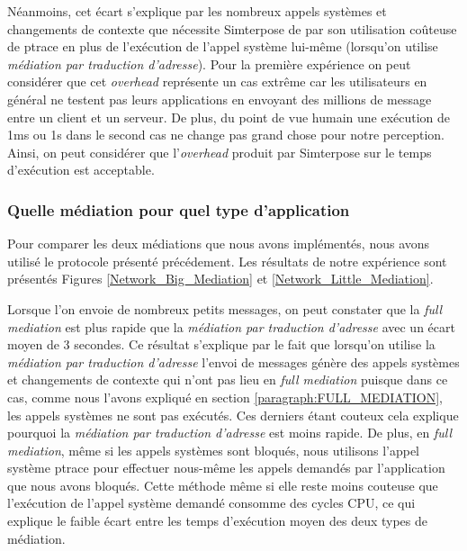 Néanmoins, cet écart s'explique par les nombreux appels systèmes et changements de contexte que nécessite Simterpose de par son utilisation coûteuse de ptrace en plus de l'exécution de l'appel système lui-même (lorsqu'on utilise \textit{médiation par traduction d'adresse}). Pour la première expérience on peut considérer que cet \textit{overhead} représente un cas extrême car les utilisateurs en général ne testent pas leurs applications en envoyant des millions de message entre un client et un serveur. De plus, du point de vue humain une exécution de 1ms ou 1s dans le second cas ne change pas grand chose pour notre perception. Ainsi, on peut considérer que l'\textit{overhead} produit par Simterpose sur le temps d'exécution est acceptable.

\subsubsection{Quelle médiation pour quel type d'application}
 Pour comparer les deux médiations que nous avons implémentés, nous avons utilisé le protocole présenté précédement. Les résultats de notre expérience sont présentés Figures \ref{Network_Big_Mediation} et \ref{Network_Little_Mediation}.

Lorsque l'on envoie de nombreux petits messages, on peut constater que la \textit{full mediation} est plus rapide que la \textit{médiation par traduction d'adresse} avec un écart moyen de 3 secondes. Ce résultat s'explique par le fait que lorsqu'on utilise la \textit{médiation par traduction d'adresse} l'envoi de messages génère des appels systèmes et changements de contexte qui n'ont pas lieu en \textit{full mediation} puisque dans ce cas, comme nous l'avons expliqué en section \ref{paragraph:FULL_MEDIATION}, les appels systèmes ne sont pas exécutés. Ces derniers étant couteux cela explique pourquoi la  \textit{médiation par traduction d'adresse} est moins rapide. De plus, en \textit{full mediation}, même si les appels systèmes sont bloqués, nous utilisons l'appel système ptrace pour effectuer nous-même les appels demandés par l'application que nous avons bloqués. Cette méthode même si elle reste moins couteuse que l'exécution de l'appel système demandé consomme des cycles CPU, ce qui explique le faible écart entre les temps d'exécution moyen des deux types de médiation.

